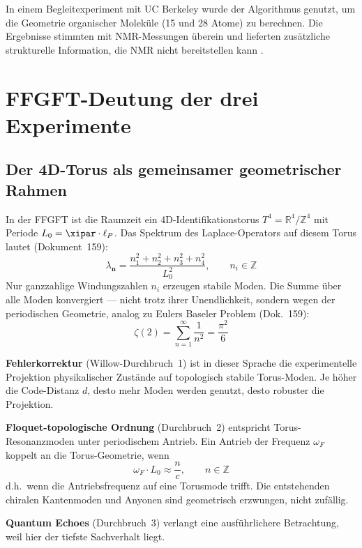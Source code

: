 In einem Begleitexperiment mit UC Berkeley wurde der Algorithmus genutzt, um die
Geometrie organischer Moleküle (15 und 28 Atome) zu berechnen. Die Ergebnisse
stimmten mit NMR-Messungen überein und lieferten zusätzliche strukturelle Information,
die NMR nicht bereitstellen kann \cite{GoogleEchoes2025}.


\section{FFGFT-Deutung der drei Experimente}

\subsection{Der 4D-Torus als gemeinsamer geometrischer Rahmen}

In der FFGFT ist die Raumzeit ein 4D-Identifikationstorus
$T^4 = \mathbb{R}^4/\mathbb{Z}^4$ mit Periode $L_0 = \xipar \cdot \ell_P$.
Das Spektrum des Laplace-Operators auf diesem Torus lautet (Dokument~159):
\begin{equation}
    \lambda_{\mathbf{n}} = \frac{n_1^2 + n_2^2 + n_3^2 + n_4^2}{L_0^2},
    \qquad n_i \in \mathbb{Z}
\end{equation}
Nur ganzzahlige Windungszahlen $n_i$ erzeugen stabile Moden. Die Summe über alle
Moden konvergiert — nicht trotz ihrer Unendlichkeit, sondern wegen der periodischen
Geometrie, analog zu Eulers Baseler Problem (Dok.~159):
\begin{equation}
    \zeta(2) = \sum_{n=1}^{\infty} \frac{1}{n^2} = \frac{\pi^2}{6}
\end{equation}

\textbf{Fehlerkorrektur} (Willow-Durchbruch~1) ist in dieser Sprache die
experimentelle Projektion physikalischer Zustände auf topologisch stabile Torus-Moden.
Je höher die Code-Distanz $d$, desto mehr Moden werden genutzt, desto robuster die
Projektion.

\textbf{Floquet-topologische Ordnung} (Durchbruch~2) entspricht Torus-Resonanzmoden
unter periodischem Antrieb. Ein Antrieb der Frequenz $\omega_F$ koppelt an die
Torus-Geometrie, wenn
\begin{equation}
    \omega_F \cdot L_0 \approx \frac{n}{c}, \qquad n \in \mathbb{Z}
\end{equation}
d.h.\ wenn die Antriebsfrequenz auf eine Torusmode trifft. Die entstehenden chiralen
Kantenmoden und Anyonen sind geometrisch erzwungen, nicht zufällig.

\textbf{Quantum Echoes} (Durchbruch~3) verlangt eine ausführlichere Betrachtung,
weil hier der tiefste Sachverhalt liegt.

